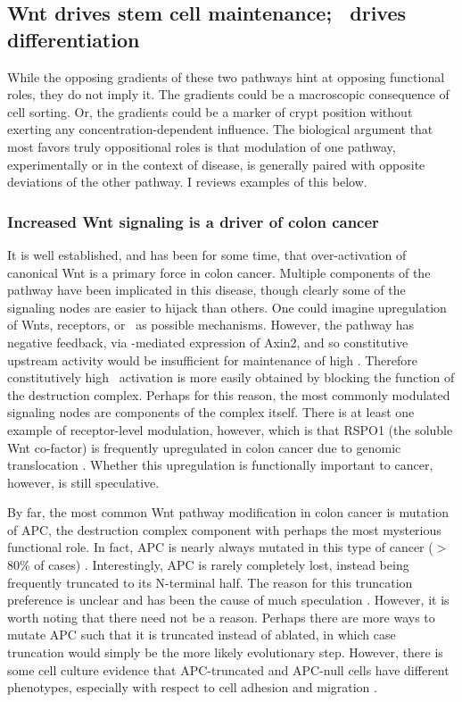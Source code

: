 \subsection{Wnt drives stem cell maintenance; \tgfbsf\ drives differentiation}

While the opposing gradients of these two pathways hint at
opposing functional roles, they do not imply it. 
The gradients could be a macroscopic consequence of cell sorting.
Or, the gradients could be a marker of crypt position without exerting any
concentration-dependent influence.
The biological argument that most favors truly oppositional roles is that
modulation of one pathway, experimentally or in the context of disease,
is generally paired with opposite deviations of the other pathway.
I reviews examples of this below.


\subsubsection{Increased Wnt signaling is a driver of colon cancer}

It is well established, and has been for some time, that over-activation of
canonical Wnt is a primary force in colon cancer. Multiple components of
the pathway have been implicated in this disease, though clearly some of
the signaling nodes are easier to hijack than others. One could imagine
upregulation of Wnts, receptors, or \bcat\ as possible
mechanisms. However, the pathway
has negative feedback, via \bcat-mediated expression of Axin2, and 
so constitutive upstream activity would be insufficient for maintenance of
high \bcat. Therefore constitutively high \bcat\
activation is more easily obtained by blocking the function of the destruction complex.
Perhaps for this reason, the most commonly modulated signaling
nodes are components of the complex itself. There is at least one example
of receptor-level modulation, however, which is that RSPO1
(the soluble Wnt co-factor) is frequently
upregulated in colon cancer due to genomic translocation \cite{Seshagiri2012}. Whether this
upregulation is functionally important to cancer, however, is still speculative.


By far, the most common Wnt pathway modification in colon cancer is mutation
of APC, the destruction complex component with perhaps the most mysterious functional role.
In fact, APC is nearly always mutated in this type of cancer ($>$80\% of cases)
\cite{He1998,Clevers2006,Roberts2012}. Interestingly, APC is rarely completely lost,
instead being frequently truncated to its
N-terminal half. The reason for this truncation preference
is unclear and has been the cause of much speculation \cite{MacDonald2009}.
However, it is worth noting that there need not be a reason.
Perhaps there are more ways to mutate APC such that it is truncated instead
of ablated, in which case truncation would simply be the more likely
evolutionary step. However, there is some cell culture evidence that APC-truncated
and APC-null cells have different phenotypes, especially with respect to cell
adhesion and migration \cite{Burgess2011}.


